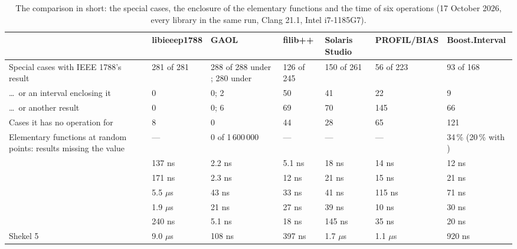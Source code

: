 \documentclass[12pt,a4paper,twoside,openright]{book}
\begin{document}
\begin{table}[htbp]
\centering\footnotesize
\setlength{\tabcolsep}{3pt}
\begin{tabular}{|L{2.15cm}|L{1.5cm}|L{2.2cm}|L{1.3cm}|L{1.6cm}|L{1.7cm}|
  L{2.0cm}|}
\hline
& \textbf{libieee\-p1788} & \textbf{GAOL} & \textbf{filib++}
& \textbf{Solaris Studio} & \textbf{PROFIL/\allowbreak BIAS}
& \textbf{Boost.\allowbreak Interval} \\
\hline
Special cases with IEEE 1788's result & 281 of 281 & 288 of 288 under
; 280 under  & 126 of 245 & 150 of 261
& 56 of 223 & 93 of 168 \\
\ldots\ or an interval enclosing it & 0 & 0; 2 & 50 & 41 & 22 & 9 \\
\ldots\ or another result & 0 & 0; 6 & 69 & 70 & 145 & 66 \\
Cases it has no operation for & 8 & 0 & 44 & 28 & 65 & 121 \\
\hline
Elementary functions at random points: results missing the value & ---
& 0 of 1\,600\,000 & --- & --- & --- & 34\,\% (20\,\% with
\allowbreak{}) \\
\hline
{} & 137 ns & 2.2 ns & 5.1 ns & 18 ns & 14 ns & 12 ns \\
 & 171 ns & 2.3 ns & 12 ns & 21 ns & 15 ns & 21 ns \\
 & 5.5 $\mu$s & 43 ns & 33 ns & 41 ns & 115 ns & 71 ns \\
 & 1.9 $\mu$s & 21 ns & 27 ns & 39 ns & 10 ns & 30 ns \\
 & 240 ns & 5.1 ns & 18 ns & 145 ns & 35 ns & 20 ns \\
Shekel 5 & 9.0 $\mu$s & 108 ns & 397 ns & 1.7 $\mu$s & 1.1 $\mu$s
& 920 ns \\
\hline
\end{tabular}
\caption[The comparison in short]{The comparison in short: the special cases, the enclosure of the
elementary functions and the time of six operations (17 October 2026, every
library in the same run, Clang 21.1, Intel i7-1185G7).}
\label{tab:computing-inshort}
\end{table}
\end{document}
